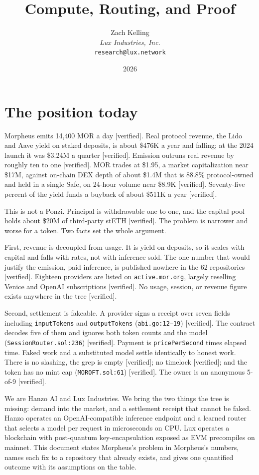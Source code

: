 \documentclass[11pt,a4paper]{article}
\title{Compute, Routing, and Proof}\author{Zach Kelling\\\textit{Lux Industries, Inc.}\\\texttt{research@lux.network}}\date{2026}
\newcommand{\code}[1]{\texttt{\small #1}}
\begin{document}
\luxcoverpage

\tableofcontents
\clearpage

\section{The position today}

Morpheus emits 14{,}400 MOR a day [verified]. Real protocol revenue, the Lido
and Aave yield on staked deposits, is about \$476K a year and falling; at the
2024 launch it was \$3.24M a quarter [verified]. Emission outruns real revenue
by roughly ten to one [verified]. MOR trades at \$1.95, a market capitalization
near \$17M, against on-chain DEX depth of about \$1.4M that is 88.8\%
protocol-owned and held in a single Safe, on 24-hour volume near \$8.9K
[verified]. Seventy-five percent of the yield funds a buyback of about \$511K a
year [verified].

This is not a Ponzi. Principal is withdrawable one to one, and the capital pool
holds about \$20M of third-party stETH [verified]. The problem is narrower and
worse for a token. Two facts set the whole argument.

First, revenue is decoupled from usage. It is yield on deposits, so it scales
with capital and falls with rates, not with inference sold. The one number that
would justify the emission, paid inference, is published nowhere in the 62
repositories [verified]. Eighteen providers are listed on \code{active.mor.org},
largely reselling Venice and OpenAI subscriptions [verified]. No usage, session,
or revenue figure exists anywhere in the tree [verified].

Second, settlement is fakeable. A provider signs a receipt over seven fields
including \code{inputTokens} and \code{outputTokens} (\code{abi.go:12--19})
[verified]. The contract decodes five of them and ignores both token counts and
the model (\code{SessionRouter.sol:236}) [verified]. Payment is
\code{pricePerSecond} times elapsed time. Faked work and a substituted model
settle identically to honest work. There is no slashing, the grep is empty
[verified]; no timelock [verified]; and the token has no mint cap
(\code{MOROFT.sol:61}) [verified]. The owner is an anonymous 5-of-9 [verified].

We are Hanzo AI and Lux Industries. We bring the two things the tree is missing:
demand into the market, and a settlement receipt that cannot be faked. Hanzo
operates an OpenAI-compatible inference endpoint and a learned router that selects
a model per request in microseconds on CPU. Lux operates a blockchain with
post-quantum key-encapsulation exposed as EVM precompiles on mainnet. This
document states Morpheus's problem in Morpheus's numbers, names each fix to a
repository that already exists, and gives one quantified outcome with its
assumptions on the table.
\end{document}
